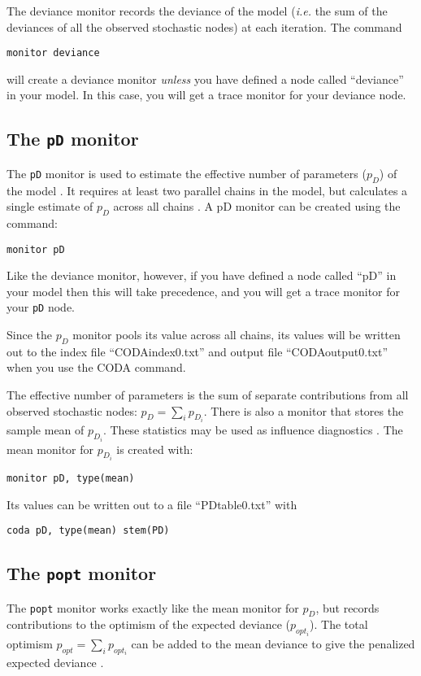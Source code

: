 \documentclass[11pt, a4paper, titlepage]{report}
\begin{document}
The deviance monitor records the deviance of the model ({\em i.e.} the
sum of the deviances of all the observed stochastic nodes) at each
iteration. The command
\begin{verbatim}
monitor deviance
\end{verbatim}
will create a deviance monitor {\em unless} you have defined a node
called ``deviance'' in your model. In this case, you will get a trace
monitor for your deviance node.

\subsection{The \texttt{pD} monitor}

The \verb+pD+ monitor is used to estimate the effective number of
parameters ($p_D$) of the model \cite{spiegelhalter:etal:2002}. It
requires at least two parallel chains in the model, but calculates
a single estimate of $p_D$ across all chains \cite{plummer:2002}.
A pD monitor can be created using the command:
\begin{verbatim}
monitor pD
\end{verbatim}
Like the deviance monitor, however, if you have defined a node called
``pD'' in your model then this will take precedence, and you will get
a trace monitor for your \verb+pD+ node.

Since the $p_D$ monitor pools its value across all chains, its values
will be written out to the index file ``CODAindex0.txt'' and
output file ``CODAoutput0.txt'' when you use the CODA command.

The effective number of parameters is the sum of separate contributions
from all observed stochastic nodes: $p_D = \sum_i p_{D_i}$. There is
also a monitor that stores the sample mean of $p_{D_i}$. These statistics
may be used as influence diagnostics \cite{spiegelhalter:etal:2002}.
The mean monitor for $p_{D_i}$ is created with:
\begin{verbatim}
monitor pD, type(mean)
\end{verbatim}
Its values can be written out to a file ``PDtable0.txt'' with
\begin{verbatim}
coda pD, type(mean) stem(PD)
\end{verbatim}

\subsection{The \texttt{popt} monitor}

The \verb+popt+ monitor works exactly like the mean monitor for $p_D$,
but records contributions to the optimism of the expected deviance
($p_{opt_i}$). The total optimism $p_{opt} = \sum_i p_{opt_i}$  can be
added to the mean deviance to give the penalized expected deviance
\cite{plummer:2008}.
\end{document}
